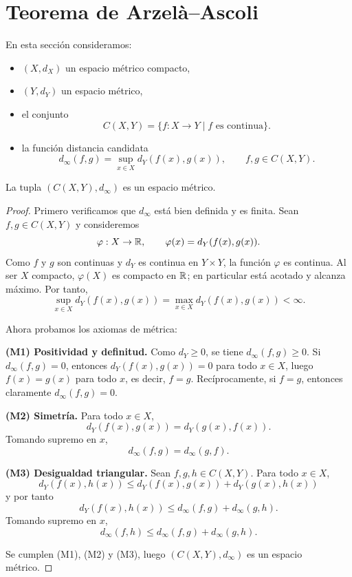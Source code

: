 \section{Teorema de Arzelà--Ascoli}

\begin{definicion}
En esta sección consideramos:
\begin{itemize}
    \item $(X,d_X)$ un espacio métrico compacto,
    \item $(Y,d_Y)$ un espacio métrico,
    \item el conjunto
    \[
    C(X,Y)=\{f:X\to Y\mid f \text{ es continua}\}.
    \]
    \item la función distancia candidata
    \[
    d_\infty(f,g)=\sup_{x\in X}d_Y(f(x),g(x)),\qquad f,g\in C(X,Y).
    \]
\end{itemize}
\end{definicion}

\begin{teorema}
La tupla $(C(X,Y),d_\infty)$ es un espacio métrico.
\end{teorema}

\begin{proof}
Primero verificamos que $d_\infty$ está bien definida y es finita.
Sean $f,g\in C(X,Y)$ y consideremos
\[
\varphi:X\to\mathbb{R},\qquad \varphi(x)=d_Y(f(x),g(x)).
\]
Como $f$ y $g$ son continuas y $d_Y$ es continua en $Y\times Y$, la función $\varphi$ es continua.
Al ser $X$ compacto, $\varphi(X)$ es compacto en $\mathbb{R}$; en particular está acotado y alcanza máximo.
Por tanto,
\[
\sup_{x\in X}d_Y(f(x),g(x))=\max_{x\in X}d_Y(f(x),g(x))<\infty.
\]

Ahora probamos los axiomas de métrica:

\textbf{(M1) Positividad y definitud.}
Como $d_Y\ge 0$, se tiene $d_\infty(f,g)\ge 0$.
Si $d_\infty(f,g)=0$, entonces $d_Y(f(x),g(x))=0$ para todo $x\in X$, luego $f(x)=g(x)$ para todo $x$,
es decir, $f=g$.
Recíprocamente, si $f=g$, entonces claramente $d_\infty(f,g)=0$.

\textbf{(M2) Simetría.}
Para todo $x\in X$,
\[
d_Y(f(x),g(x))=d_Y(g(x),f(x)).
\]
Tomando supremo en $x$,
\[
d_\infty(f,g)=d_\infty(g,f).
\]

\textbf{(M3) Desigualdad triangular.}
Sean $f,g,h\in C(X,Y)$. Para todo $x\in X$,
\[
d_Y(f(x),h(x))\le d_Y(f(x),g(x))+d_Y(g(x),h(x))
\]
y por tanto
\[
d_Y(f(x),h(x))\le d_\infty(f,g)+d_\infty(g,h).
\]
Tomando supremo en $x$,
\[
d_\infty(f,h)\le d_\infty(f,g)+d_\infty(g,h).
\]

Se cumplen (M1), (M2) y (M3), luego $(C(X,Y),d_\infty)$ es un espacio métrico.
\end{proof}

